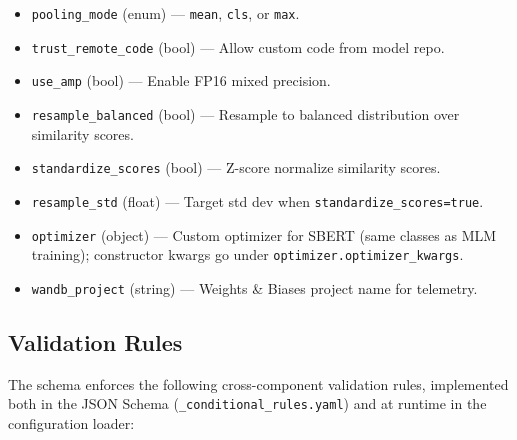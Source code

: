 \begin{itemize}[nosep]
    \item \texttt{pooling\_mode} (enum) --- \texttt{mean}, \texttt{cls}, or \texttt{max}.
    \item \texttt{trust\_remote\_code} (bool) --- Allow custom code from model repo.
    \item \texttt{use\_amp} (bool) --- Enable FP16 mixed precision.
    \item \texttt{resample\_balanced} (bool) --- Resample to balanced distribution over similarity scores.
    \item \texttt{standardize\_scores} (bool) --- Z-score normalize similarity scores.
    \item \texttt{resample\_std} (float) --- Target std dev when \texttt{standardize\_scores=true}.
    \item \texttt{optimizer} (object) --- Custom optimizer for SBERT (same classes as MLM training); constructor kwargs go under \texttt{optimizer.optimizer\_kwargs}.
    \item \texttt{wandb\_project} (string) --- Weights \& Biases project name for telemetry.
\end{itemize}

\subsection{Validation Rules}

The schema enforces the following cross-component validation rules, implemented both in the JSON Schema (\texttt{\_conditional\_rules.yaml}) and at runtime in the configuration loader:

